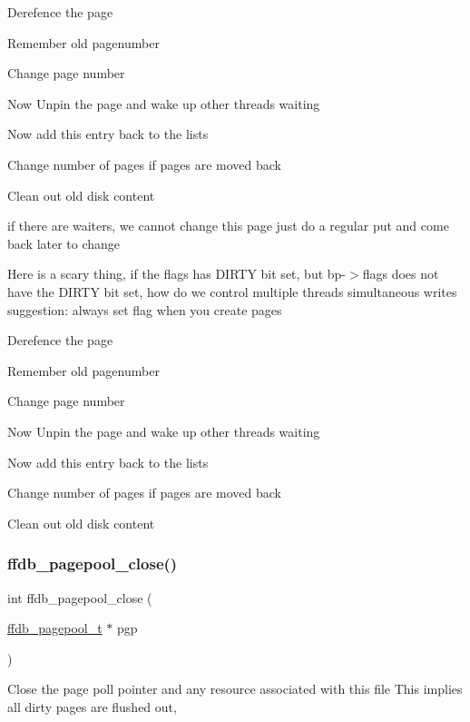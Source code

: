 Derefence the page

Remember old pagenumber

Change page number

Now Unpin the page and wake up other threads waiting

Now add this entry back to the lists

Change number of pages if pages are moved back

Clean out old disk content

if there are waiters, we cannot change this page just do a regular put and come back later to change

Here is a scary thing, if the flags has D\+I\+R\+TY bit set, but bp-\/$>$flags does not have the D\+I\+R\+TY bit set, how do we control multiple threads simultaneous writes suggestion\+: always set flag when you create pages

Derefence the page

Remember old pagenumber

Change page number

Now Unpin the page and wake up other threads waiting

Now add this entry back to the lists

Change number of pages if pages are moved back

Clean out old disk content\mbox{\label{adat-devel_2other__libs_2filedb_2filehash_2ffdb__pagepool_8h_a73c44ef71020216252a28a384316dd93}} 
\subsubsection{\texorpdfstring{ffdb\_pagepool\_close()}{ffdb\_pagepool\_close()}}
{\footnotesize\ttfamily int ffdb\+\_\+pagepool\+\_\+close (\begin{DoxyParamCaption}\item[{\mbox{\hyperlink{adat-devel_2other__libs_2filedb_2filehash_2ffdb__pagepool_8h_a73290f737b0e5f8be90a0fa96ddf6ab6}{ffdb\+\_\+pagepool\+\_\+t}} $\ast$}]{pgp }\end{DoxyParamCaption})}

Close the page poll pointer and any resource associated with this file This implies all dirty pages are flushed out,


